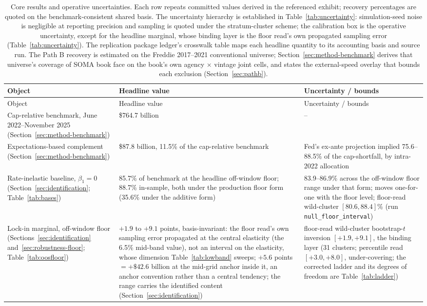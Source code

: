 \documentclass[12pt]{article}
\begin{document}
{\footnotesize
\begin{longtable}{@{}p{4.6cm}p{4.6cm}p{5.3cm}@{}}
\caption{Core results and operative uncertainties. Each row repeats committed values derived in the referenced exhibit; recovery percentages are quoted on the benchmark-consistent shared basis. The uncertainty hierarchy is established in Table~\ref{tab:uncertainty}: simulation-seed noise is negligible at reporting precision and sampling is quoted under the stratum-cluster scheme; the calibration box is the operative uncertainty, except for the headline marginal, whose binding layer is the floor read's own propagated sampling error (Table~\ref{tab:uncertainty}). The replication package ledger's crosswalk table maps each headline quantity to its accounting basis and source run. The Path B recovery is estimated on the Freddie 2017--2021 conventional universe; Section~\ref{sec:method-benchmark} derives that universe's coverage of SOMA book face on the book's own agency $\times$ vintage joint cells, and states the external-speed overlay that bounds each exclusion (Section~\ref{sec:pathb}).}
\label{tab:headline}\\
\toprule
Object & Headline value & Uncertainty / bounds \\
\midrule
\endfirsthead
\toprule
Object & Headline value & Uncertainty / bounds \\
\midrule
\endhead
Cap-relative benchmark, June 2022--November 2025 (Section~\ref{sec:method-benchmark}) & \$764.7 billion & -- \\
Expectations-based complement (Section~\ref{sec:method-benchmark}) & \$87.8 billion, 11.5\% of the cap-relative benchmark & Fed's ex-ante projection implied 75.6--88.5\% of the cap-shortfall, by intra-2022 allocation \\
Rate-inelastic baseline, $\beta_1 = 0$ (Section~\ref{sec:identification}; Table~\ref{tab:bases}) & 85.7\% of benchmark at the headline off-window floor; 88.7\% in-sample, both under the production floor form (35.6\% under the additive form) & 83.9--86.9\% across the off-window floor range under that form; moves one-for-one with the floor level; floor-read wild-cluster $[80.6, 88.4]$\% (run \texttt{null\_floor\_interval}) \\
Lock-in marginal, off-window floor (Sections~\ref{sec:identification} and~\ref{sec:robustness-floor}; Table~\ref{tab:oosfloor}) & $+1.9$ to $+9.1$ points, basis-invariant: the floor read's own sampling error propagated at the central elasticity (the 6.5\% mid-band value), not an interval on the elasticity, whose dimension Table~\ref{tab:lowband} sweeps; $+5.6$ points $= +\$42.6$ billion at the mid-grid anchor inside it, an anchor convention rather than a central tendency; the range carries the identified content (Section~\ref{sec:identification}) & floor-read wild-cluster bootstrap-$t$ inversion $[+1.9, +9.1]$, the binding layer (31 clusters; percentile read $[+3.0, +8.0]$, under-covering; the corrected ladder and its degrees of freedom are Table~\ref{tab:ladder})\tnote{a} \\

\end{longtable}}
\end{document}
